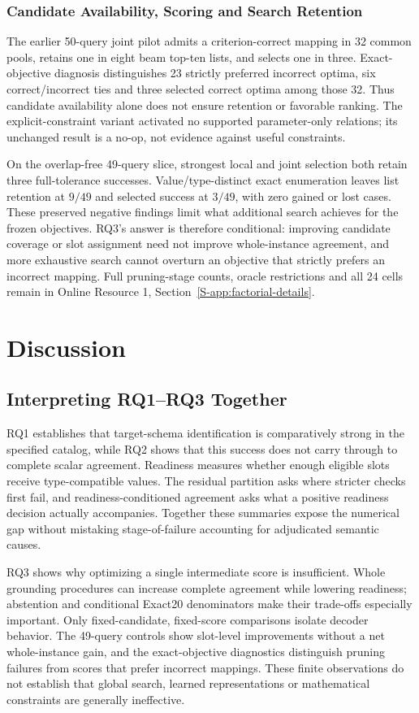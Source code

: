 \documentclass[pdflatex,iicol,sn-basic,Numbered]{sn-jnl}
\begin{document}
\subsubsection{Candidate Availability, Scoring and Search Retention}
The earlier 50-query joint pilot admits a criterion-correct mapping in 32 common pools, retains one in eight beam top-ten lists, and selects one in three. Exact-objective diagnosis distinguishes 23 strictly preferred incorrect optima, six correct/incorrect ties and three selected correct optima among those 32. Thus candidate availability alone does not ensure retention or favorable ranking. The explicit-constraint variant activated no supported parameter-only relations; its unchanged result is a no-op, not evidence against useful constraints.

On the overlap-free 49-query slice, strongest local and joint selection both retain three full-tolerance successes. Value/type-distinct exact enumeration leaves list retention at $9/49$ and selected success at $3/49$, with zero gained or lost cases. These preserved negative findings limit what additional search achieves for the frozen objectives. RQ3's answer is therefore conditional: improving candidate coverage or slot assignment need not improve whole-instance agreement, and more exhaustive search cannot overturn an objective that strictly prefers an incorrect mapping. Full pruning-stage counts, oracle restrictions and all 24 cells remain in Online Resource 1, Section~\ref{S-app:factorial-details}.

\section{Discussion}
\label{sec:discussion}
\subsection{Interpreting RQ1--RQ3 Together}
RQ1 establishes that target-schema identification is comparatively strong in the specified catalog, while RQ2 shows that this success does not carry through to complete scalar agreement. Readiness measures whether enough eligible slots receive type-compatible values. The residual partition asks where stricter checks first fail, and readiness-conditioned agreement asks what a positive readiness decision actually accompanies. Together these summaries expose the numerical gap without mistaking stage-of-failure accounting for adjudicated semantic causes.

RQ3 shows why optimizing a single intermediate score is insufficient. Whole grounding procedures can increase complete agreement while lowering readiness; abstention and conditional Exact20 denominators make their trade-offs especially important. Only fixed-candidate, fixed-score comparisons isolate decoder behavior. The 49-query controls show slot-level improvements without a net whole-instance gain, and the exact-objective diagnostics distinguish pruning failures from scores that prefer incorrect mappings. These finite observations do not establish that global search, learned representations or mathematical constraints are generally ineffective.
\end{document}
